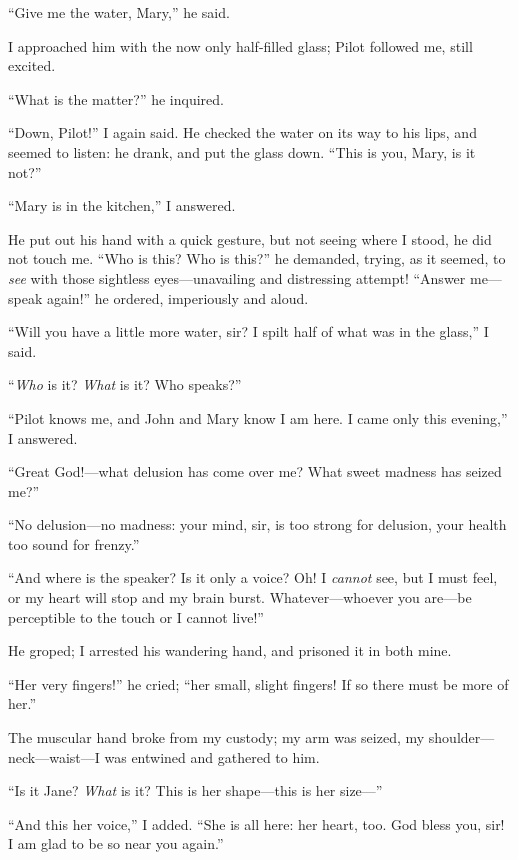 \enquote{Give me the water, Mary,} he said.

I approached him with the now only half-filled glass; Pilot followed me,
still excited.

\enquote{What is the matter?} he inquired.

\enquote{Down, Pilot!} I again said. He checked the water on its way to
his lips, and seemed to listen: he drank, and put the glass down. 
\enquote{This is you, Mary, is it not?}

\enquote{Mary is in the kitchen,} I answered.

He put out his hand with a quick gesture, but not seeing where I stood,
he did not touch me. \enquote{Who is this? Who is this?} he demanded,
trying, as it seemed, to \emph{see} with those sightless
eyes---unavailing and distressing attempt! \enquote{Answer me---speak
again!} he ordered, imperiously and aloud.

\enquote{Will you have a little more water, sir? I spilt half of what
was in the glass,} I said.

\enquote{\emph{Who} is it? \emph{What} is it? Who speaks?}

\enquote{Pilot knows me, and John and Mary know I am here. I came only
this evening,} I answered.

\enquote{Great God!---what delusion has come over me? What sweet
madness has seized me?}

\enquote{No delusion---no madness: your mind, sir, is too strong for
delusion, your health too sound for frenzy.}

\enquote{And where is the speaker? Is it only a voice? Oh! I \emph{cannot}
see, but I must feel, or my heart will stop and my brain burst. 
Whatever---whoever you are---be perceptible to the touch or I cannot
live!}

He groped; I arrested his wandering hand, and prisoned it in both mine.

\enquote{Her very fingers!} he cried; \enquote{her small, slight
fingers! If so there must be more of her.}

The muscular hand broke from my custody; my arm was seized, my
shoulder---neck---waist---I was entwined and gathered to him.

\enquote{Is it Jane? \emph{What} is it? This is her shape---this is her
size---}

\enquote{And this her voice,} I added. \enquote{She is all here: her
heart, too. God bless you, sir! I am glad to be so near you again.}

